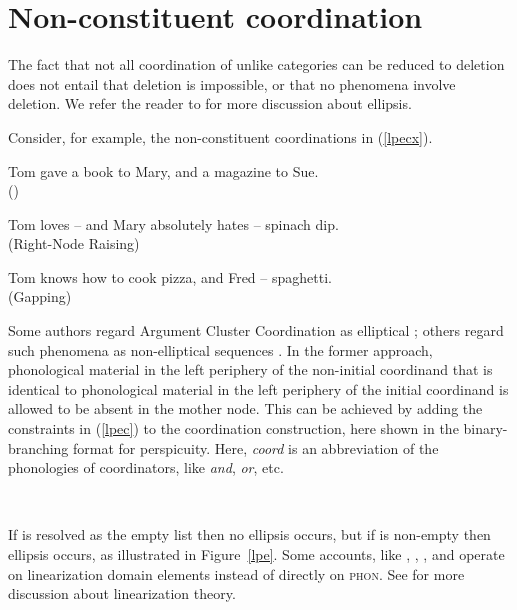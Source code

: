 \section{Non-constituent coordination}
\label{sec-non-constituent-coordination}

The fact that not all coordination of unlike categories can be reduced to deletion  does not entail that
deletion is impossible, or that no phenomena involve deletion.
We refer the reader to  for more discussion about ellipsis.

Consider, for example, the non-constituent coordinations in (\ref{lpecx}). 

\eal
\label{lpecx}
\ex 
\label{ex-tom-gave-a-book-to-mary-and-a-magazine-to-sue}
Tom gave a book to Mary, and a magazine to Sue.\\
()

\ex Tom loves -- and Mary absolutely hates -- spinach dip.\\
(Right-Node Raising)

\ex Tom knows how to cook pizza, and Fred -- spaghetti.\\
(Gapping)

\zl

Some authors regard Argument Cluster Coordination as elliptical \citep{yatabe01,Crysmann:04,Beavers}; others
regard such phenomena as non-elliptical sequences \citep{Mouret:06}.
In the former approach,  phonological material in the left periphery of the non-initial coordinand that is identical to
phonological material in the left periphery of the initial coordinand is allowed to be absent in the mother node.
This can be achieved by adding the constraints in (\ref{lpec}) to the coordination construction, here shown in the binary-branching format for perspicuity.
Here, \textit{coord} is an abbreviation of the phonologies of coordinators, like
\textit{and}, \textit{or}, etc.

\ea
\label{lpec}
 \impl\\
\z

\noindent
If  is resolved as the empty list then no ellipsis occurs, but if  is non-empty then ellipsis occurs, as illustrated in Figure~\ref{lpe}. 
Some accounts, like  \citet{yatabe01}, \citet{Crysmann:04}, \citet{Beavers}, and \citet{chaveslp} operate on
linearization domain\label{page-linearization-domains-in-coordination-two} elements instead of directly on \textsc{phon}.  
See  for more discussion about linearization theory.


